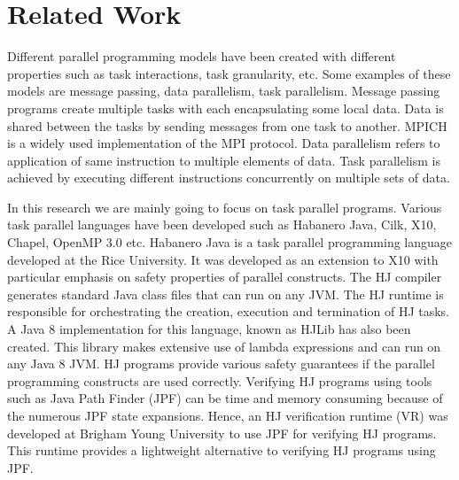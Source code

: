 \section{Related Work}

Different parallel programming models have been created with different properties such as task interactions, task granularity,  etc. Some examples of these models are message passing, data parallelism, task parallelism. Message passing \cite{Forum:1994:MMI:898758} programs create multiple tasks with each encapsulating some local data. Data is shared between the tasks by sending messages from one task to another. MPICH is a widely used implementation of the MPI protocol. Data parallelism refers to application of same instruction to multiple elements of data. Task parallelism is achieved by executing different instructions concurrently on multiple sets of data.

In this research we are mainly going to focus on task parallel programs. Various task parallel languages have been developed such as Habanero Java, Cilk, X10, Chapel, OpenMP 3.0 etc. Habanero Java \cite{cave2011habanero} is a task parallel programming language developed at the Rice University. It was developed as an extension to X10 with particular emphasis on safety properties of parallel constructs. The HJ compiler generates standard Java class files that can run on any JVM. The HJ runtime is responsible for orchestrating the creation, execution and termination of HJ tasks. A Java 8 implementation for this language, known as HJLib \cite{imam2014habanero} has also been created. This library makes extensive use of lambda expressions and can run on any Java 8 JVM. HJ programs provide various safety guarantees if the parallel programming constructs are used correctly. Verifying HJ programs using tools such as Java Path Finder (JPF) can be time and memory consuming because of the numerous JPF state expansions. Hence, an HJ verification runtime (VR) \cite{anderson2014jpf} was developed at Brigham Young University to use JPF for verifying HJ programs. This runtime provides a lightweight alternative to verifying HJ programs using JPF.

